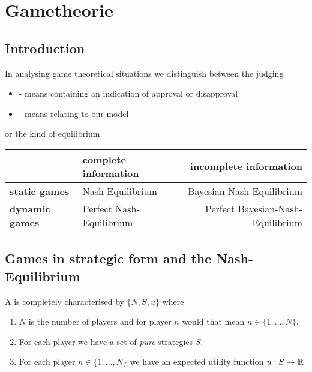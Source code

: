 \chapter{Gametheorie}
\section*{Introduction}
In analysing game theoretical situations we distinguish between the judging
\begin{itemize}
	\item {} - means containing an indication of approval or disapproval
	\item {} - means relating to our model
\end{itemize}

or the kind of equilibrium

\begin{tabular}{|l|l|r|}
	\hline\hline
  			& {\textbf{complete information}} & {\textbf{incomplete information}} \\
                                                    \hline
   \textbf{static games} & Nash-Equilibrium & Bayesian-Nash-Equilibrium\arrayrulewidth2pt \\
                                               \cline{1-3}
   \textbf{dynamic games} & Perfect Nash-Equilibrium & Perfect Bayesian-Nash-Equilibrium \\ \hline\hline
\end{tabular}

\section{Games in strategic form and the Nash-Equilibrium}
A  is completely characterised by $\{ N, S, u \}$ where
	\begin{enumerate}
		\item $N$ is the number of players and for player $n$ would that mean $n \in \{ 1, \dotsc, N \}$.
		\item For each player we have a set of \textit{pure} strategies $S$.
		\item For each player $n \in \{1, \dotsc, N \}$ we have an expected utility function $u : S \rightarrow \mathbb{R}$
	\end{enumerate}

